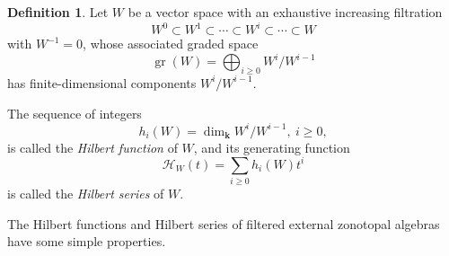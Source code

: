 \documentclass[reqno]{article}
\theoremstyle{plain} %
\theoremstyle{definition}
\newtheorem{definition}[theorem]{Definition}
\theoremstyle{remark}
\DeclareMathOperator{\gr}{gr}
\newcommand{\K} {\mathbf{k}}
\newcommand{\hs}{\mathscr{H}}
\numberwithin{equation}{section}
\begin{document}
\begin{definition}
  Let $W$ be a vector space with an exhaustive increasing filtration
\[ W^0 \subset W^1 \subset \cdots \subset W^i \subset \cdots \subset W
\]
 with $W^{-1}=0$, whose associated graded space
  \begin{equation}
    \label{eq:adj}
    \gr(W)=\bigoplus_{i\ge 0}W^i/W^{i-1}
  \end{equation}
  has finite-dimensional components $W^i/W^{i-1}$.

The sequence of integers
   \[ h_i(W)=\dim_\K W^i/W^{i-1} ,  \ i\ge 0,  \]
  is called the  \emph{Hilbert function} of $W$, and its generating function
  \begin{equation}
    \label{eq:hilb_series}
    \hs_W(t)=\sum_{i\ge 0}h_i(W)t^i
  \end{equation}
    is called the \emph{Hilbert series} of $W$.
  \end{definition}

The Hilbert functions and Hilbert series of  filtered external zonotopal algebras have some simple properties.
\end{document}
